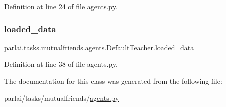 Definition at line 24 of file agents.\+py.

\mbox{\label{classparlai_1_1tasks_1_1mutualfriends_1_1agents_1_1DefaultTeacher_a36b8bfe95e840334f7db7fe93f54c646}} 
\subsubsection{\texorpdfstring{loaded\+\_\+data}{loaded\_data}}
{\footnotesize\ttfamily parlai.\+tasks.\+mutualfriends.\+agents.\+Default\+Teacher.\+loaded\+\_\+data}



Definition at line 38 of file agents.\+py.



The documentation for this class was generated from the following file\+:\begin{DoxyCompactItemize}
\item 
parlai/tasks/mutualfriends/\hyperlink{parlai_2tasks_2mutualfriends_2agents_8py}{agents.\+py}\end{DoxyCompactItemize}
